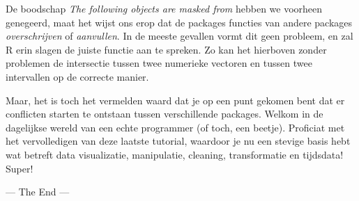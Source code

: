 \documentclass[]{tufte-book}
\begin{document}
De boodschap \emph{The following objects are masked from} hebben we voorheen genegeerd, maat het wijst ons erop dat de packages functies van andere packages \emph{overschrijven} of \emph{aanvullen}. In de meeste gevallen vormt dit geen probleem, en zal R erin slagen de juiste functie aan te spreken. Zo kan het hierboven zonder problemen de intersectie tussen twee numerieke vectoren en tussen twee intervallen op de correcte manier.

Maar, het is toch het vermelden waard dat je op een punt gekomen bent dat er conflicten starten te ontstaan tussen verschillende packages. Welkom in de dagelijkse wereld van een echte programmer (of toch, een beetje). Proficiat met het vervolledigen van deze laatste tutorial, waardoor je nu een stevige basis hebt wat betreft data visualizatie, manipulatie, cleaning, transformatie en tijdsdata! Super!

--- The End ---


\end{document}
